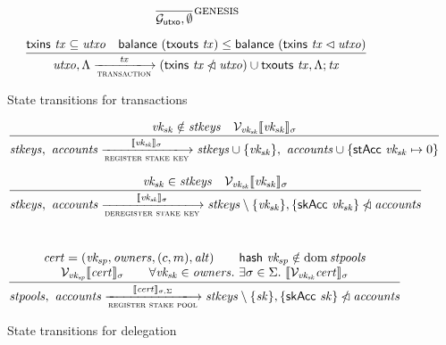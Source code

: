 \documentclass[11pt,a4paper]{article}
\DeclareMathOperator{\dom}{dom}
\begin{document}
\begin{figure}


\begin{equation*}
\frac{
}{
\mathcal{G}_{\mathsf{utxo}}, \emptyset
}
\textsc{genesis}
\end{equation*}

\begin{equation*}
\frac{
\mathsf{txins} ~ \mathit{tx} \subseteq \mathit{utxo} \quad \mathsf{balance}~(\mathsf{txouts}~\mathit{tx}) \leq \mathsf{balance}~(\mathsf{txins} ~ \mathit{tx} \restrictdom \mathit{utxo})
}{
\mathit{utxo}, \Lambda \xlongrightarrow[\textsc{transaction}]{\mathit{tx}} (\mathsf{txins} ~ \mathit{tx} \subtractdom \mathit{utxo}) \cup \mathsf{txouts}~\mathit{tx},  \Lambda ; \mathit{tx}
}
\end{equation*}

\caption{\label{fig:transaction_transitions}State transitions for transactions}
\end{figure}


\begin{figure}

\begin{equation*}
\frac{
  \mathit{vk_{sk}} \notin \mathit{stkeys} \quad
  \mathcal{V}_{\mathit{vk_{sk}}}\llbracket\mathit{vk_{sk}}\rrbracket_\sigma
}{
  \mathit{stkeys}, ~ \mathit{accounts}
  \xlongrightarrow[\textsc{register stake key}]{\llbracket\mathit{vk_{sk}}\rrbracket_\sigma}
  \mathit{stkeys} \cup \{\mathit{vk_{sk}}\}, ~
  \mathit{accounts} \cup \{\mathsf{stAcc}~\mathit{vk_{sk}} \mapsto 0\}
}
\end{equation*}

\begin{equation*}
\frac{
  \mathit{vk_{sk}} \in \mathit{stkeys} \quad
  \mathcal{V}_{\mathit{vk_{sk}}}\llbracket\mathit{vk_{sk}}\rrbracket_\sigma
}{
  \mathit{stkeys}, ~ \mathit{accounts}
  \xlongrightarrow[\textsc{deregister stake key}]{\llbracket\mathit{vk_{sk}}\rrbracket_\sigma}
  \mathit{stkeys} \setminus \{\mathit{vk_{sk}}\},
  \{\mathsf{skAcc}~\mathit{vk_{sk}}\} \subtractdom \mathit{accounts}
}
\end{equation*}
%
\\[1em]
%
\begin{equation*}
\frac{
  \begin{array}{c}
  \mathit{cert} = (\mathit{vk_{sp}}, \mathit{owners}, (c, m), \mathit{alt}) \quad\quad \mathsf{hash} ~ \mathit{vk_{sp}} \notin \dom \mathit{stpools} \\
  \mathcal{V}_{\mathit{vk_{sp}}}\llbracket\mathit{cert}\rrbracket_\sigma \quad\quad  \forall \mathit{vk_{sk}} \in \mathit{owners}. ~ \exists \sigma \in \Sigma. ~ \llbracket\mathcal{V}_{\mathit{vk_{sk}}}\mathit{cert}\rrbracket_\sigma
  \end{array}
}{
  \mathit{stpools}, ~ \mathit{accounts}
  \xlongrightarrow[\textsc{register stake pool}]{\llbracket \mathit{cert} \rrbracket_{\sigma,\Sigma}}
  \mathit{stkeys} \setminus \{\mathit{sk}\},
  \{\mathsf{skAcc}~\mathit{sk}\} \subtractdom \mathit{accounts}
}
\end{equation*}

\caption{\label{fig:delegation_transitions}State transitions for delegation}
\end{figure}



\end{document}
